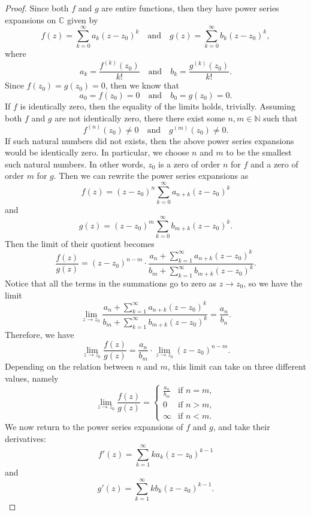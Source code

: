 \documentclass[12pt]{article}
\newcommand{\ds}{\displaystyle}
\newcommand{\isp}[1]{\quad\text{#1}\quad}
\newcommand{\N}{\mathbb{N}}
\newcommand{\C}{\mathbb{C}}
\begin{document}
\begin{proof}
    Since both $f$ and $g$ are entire functions, then they have power series expansions on $\C$ given by
    \[
        f(z) = \sum_{k=0}^\infty a_k (z - z_0)^k \isp{and} g(z) = \sum_{k=0}^\infty b_k (z - z_0)^k,
    \]
    where
    \[
        a_k = \frac{f^{(k)}(z_0)}{k!} \isp{and} b_k = \frac{g^{(k)}(z_0)}{k!}.
    \]
    Since $f(z_0) = g(z_0) = 0$, then we know that
    \[
        a_0 = f(z_0) = 0 \isp{and} b_0 = g(z_0) = 0.
    \]
    If $f$ is identically zero, then the equality of the limits holds, trivially. Assuming both $f$ and $g$ are not identically zero, there there exist some $n, m \in \N$ such that
    \[
        f^{(n)}(z_0) \ne 0 \isp{and} g^{(m)}(z_0) \ne 0.
    \]
    If such natural numbers did not exists, then the above power series expansions would be identically zero. In particular, we choose $n$ and $m$ to be the smallest such natural numbers. In other words, $z_0$ is a zero of order $n$ for $f$ and a zero of order $m$ for $g$. Then we can rewrite the power series expansions as
    \[
        f(z) = (z - z_0)^n \sum_{k=0}^\infty a_{n+k} (z - z_0)^k
    \]
    and
    \[
        g(z) = (z - z_0)^m \sum_{k=0}^\infty b_{m+k} (z - z_0)^k.
    \]
    Then the limit of their quotient becomes
    \[
        \frac{f(z)}{g(z)} 
            = (z - z_0)^{n-m} 
            \cdot \frac{a_n + \ds\sum_{k=1}^\infty a_{n+k} (z - z_0)^k}{b_m + \ds\sum_{k=1}^\infty b_{m+k} (z - z_0)^k}.
    \]
    Notice that all the terms in the summations go to zero as $z \to z_0$, so we have the limit
    \[
        \lim_{z \to z_0} \frac{a_n + \ds\sum_{k=1}^\infty a_{n+k} (z - z_0)^k}{b_m + \ds\sum_{k=1}^\infty b_{m+k} (z - z_0)^k} = \frac{a_n}{b_n}.
    \]
    Therefore, we have
    \[
        \lim_{z \to z_0} \frac{f(z)}{g(z)} = \frac{a_n}{b_m} \cdot \lim_{z \to z_0} (z - z_0)^{n-m}.
    \]
    Depending on the relation between $n$ and $m$, this limit can take on three different values, namely
    \[\tag{1}
        \lim_{z \to z_0} \frac{f(z)}{g(z)} = \begin{cases}
            \frac{a_n}{b_m} & \text{if $n = m$}, \\
            0 & \text{if $n > m$}, \\
            \infty & \text{if $n < m$}.
        \end{cases}
    \]
    We now return to the power series expansions of $f$ and $g$, and take their derivatives:
    \[
        f'(z) = \sum_{k=1}^\infty k a_k (z - z_0)^{k-1}
    \]
    and
    \[
        g'(z) = \sum_{k=1}^\infty k b_k (z - z_0)^{k-1}.
\]
\end{proof}
\end{document}
